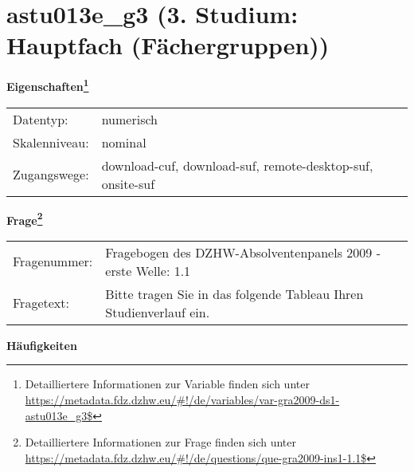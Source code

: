 
    \setcounter{footnote}{0}

    \vspace*{-1.8cm}
	\section{astu013e\_g3 (3. Studium: Hauptfach (Fächergruppen))}
	\label{section:astu013e_g3}



    \vspace*{0.5cm}
    \noindent\textbf{Eigenschaften\footnote{Detailliertere Informationen zur Variable finden sich unter
		\url{https://metadata.fdz.dzhw.eu/\#!/de/variables/var-gra2009-ds1-astu013e_g3$}}}\\
	\begin{tabularx}{\hsize}{@{}lX}
	Datentyp: & numerisch \\
	Skalenniveau: & nominal \\
	Zugangswege: &
	  download-cuf, 
	  download-suf, 
	  remote-desktop-suf, 
	  onsite-suf
 \\
    \end{tabularx}



				\vspace*{0.5cm}
                \noindent\textbf{Frage\footnote{Detailliertere Informationen zur Frage finden sich unter
		              \url{https://metadata.fdz.dzhw.eu/\#!/de/questions/que-gra2009-ins1-1.1$}}}\\
				\begin{tabularx}{\hsize}{@{}lX}
					Fragenummer: &
					  Fragebogen des DZHW-Absolventenpanels 2009 - erste Welle:
					  1.1
 \\
					Fragetext: & Bitte tragen Sie in das folgende Tableau Ihren Studienverlauf ein. \\
				\end{tabularx}





        		\vspace*{0.5cm}
                \noindent\textbf{Häufigkeiten}

